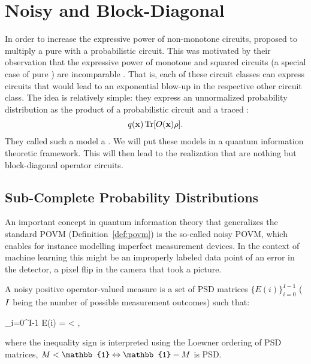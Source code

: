 \section{Noisy and Block-Diagonal \puncs}
\label{sec:noisyblockdiagonalpuncs}

In order to increase the expressive power of non-monotone circuits, \citet{loconte2025sum} proposed to multiply a pure \punc with a probabilistic circuit.
This was motivated by their observation that the expressive power of monotone and squared circuits (a special case of pure \puncs) are incomparable \citep{decolnet2021compilation}. That is, each of these circuit classes can express circuits that would lead to an exponential blow-up in the respective other circuit class. The idea is relatively simple: they express an unnormalized probability distribution as the product of a probabilistic circuit and a traced \punc:
\begin{align}
	q(\mathbf{x}) \Tr [O(\mathbf{x}) \rho].
\end{align}
They called such a model a \msocs. We will put these models in a quantum information theoretic framework. This will then lead to the realization that \msocss are nothing but block-diagonal operator circuits.


\subsection{Sub-Complete Probability Distributions}

An important concept in quantum information theory that generalizes the standard POVM (\cf Definition~\ref{def:povm}) is the so-called noisy POVM, which enables for instance modelling imperfect measurement devices. In the context of machine learning this might be an improperly labeled data point of an error in the detector, \eg a pixel flip in the camera that took a picture.
\begin{definition}
	\label{def:noisypovm}
	A noisy positive operator-valued measure
	is a set of PSD  matrices $\{E(i)\}_{i=0}^{I-1}$ ($I$ being the number of possible measurement outcomes) such that:
	\begin{talign}
		\sum_{i=0}^{I-1} E(i) = \subcompletemeasrure < ,
	\end{talign}
	where the inequality sign is interpreted using the Loewner ordering of PSD matrices,
	\ie $\subcompletemeasrure < \mathbb{1} \Leftrightarrow\mathbb{1}-\subcompletemeasrure$ is PSD.
\end{definition}

